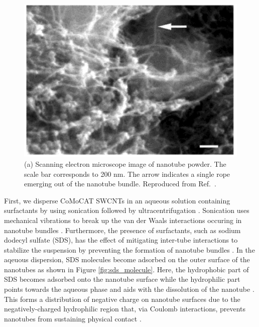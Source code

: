 \begin{figure}[h]
	\centering
	\includegraphics[scale=0.3]{images/chapter_methods/sem_cnt_powder_bandy}
	\caption{(a) Scanning electron microscope image of nanotube powder. The scale bar corresponds to 200 nm. The arrow indicates a single rope emerging out of the nanotube bundle. Reproduced from Ref.\ \cite{bandyopadhyaya2002stabilization}.}
\end{figure}


First, we disperse CoMoCAT SWCNTs in an aqueous solution containing surfactants by using sonication followed by ultracentrifugation \cite{ichinose2017extraction}. Sonication uses mechanical vibrations to break up the van der Waals interactions occuring in nanotube bundles \cite{tkalya2012use}. Furthermore, the presence of surfactants, such as sodium dodecyl sulfate (SDS), has the effect of mitigating inter-tube interactions to stabilize the suspension by preventing the formation of nanotube bundles \cite{vaisman2006role}. In the aqeuous dispersion, SDS molecules become adsorbed on the outer surface of the nanotubes as shown in Figure \ref{fig:sds_molecule}. Here, the hydrophobic part of SDS becomes adsorbed onto the nanotube surface while the hydrophilic part points towards the aqueous phase and aids with the dissolution of the nanotube \cite{richard2003supramolecular}. This forms a distribution of negative charge on nanotube surfaces due to the negatively-charged hydrophilic region that, via Coulomb interactions, prevents nanotubes from sustaining physical contact \cite{richard2003supramolecular}.

